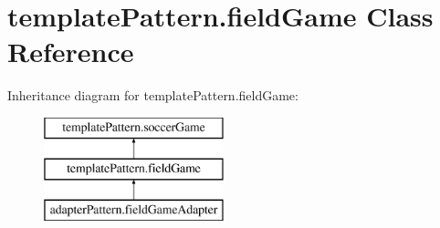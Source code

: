 \hypertarget{classtemplate_pattern_1_1field_game}{}\section{template\+Pattern.\+field\+Game Class Reference}
\label{classtemplate_pattern_1_1field_game}
Inheritance diagram for template\+Pattern.\+field\+Game\+:\begin{figure}[H]
\begin{center}
\leavevmode
\includegraphics[height=3.000000cm]{classtemplate_pattern_1_1field_game}
\end{center}
\end{figure}
